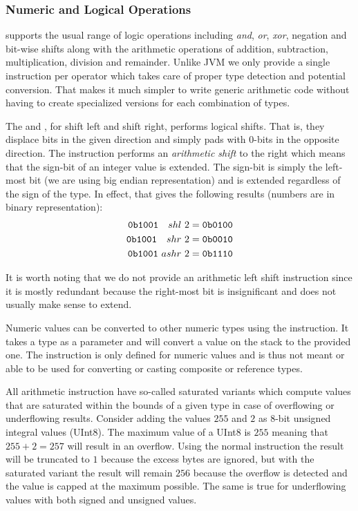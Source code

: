 \subsubsection{Numeric and Logical Operations}
\label{sec:design:stack:logic}

\thename{} supports the usual range of logic operations including \emph{and},
\emph{or}, \emph{xor}, negation and bit-wise shifts along with the arithmetic
operations of addition, subtraction, multiplication, division and
remainder. Unlike JVM we only provide a single instruction per operator which
takes care of proper type detection and potential conversion. That makes it much
simpler to write generic arithmetic code without having to create specialized
versions for each combination of types.

The  and , for shift left and shift right,
performs logical shifts. That is, they displace bits in the given direction and
simply pads with 0-bits in the opposite direction. The 
instruction performs an \textit{arithmetic shift} to the right which means that
the sign-bit of an integer value is extended. The sign-bit is simply the
left-most bit (we are using big endian representation) and is extended
regardless of the sign of the type. In effect, that gives the following results
(numbers are in binary representation): %
\begin{align*}
  {\tt 0b1001}\ \ \ shl\  2 &= {\tt 0b0100} \\
  {\tt 0b1001}\ \ \ shr\  2 &= {\tt 0b0010} \\
  {\tt 0b1001}\     ashr\ 2 &= {\tt 0b1110}
\end{align*}

It is worth noting that we do not provide an arithmetic left shift instruction
since it is mostly redundant because the right-most bit is insignificant and
does not usually make sense to extend.

Numeric values can be converted to other numeric types using the 
instruction. It takes a type as a parameter and will convert a value on the
stack to the provided one. The  instruction is only defined for
numeric values and is thus not meant or able to be used for converting or
casting composite or reference types.

All arithmetic instruction have so-called saturated variants which compute
values that are saturated within the bounds of a given type in case of
overflowing or underflowing results. Consider adding the values $255$ and $2$ as
8-bit unsigned integral values (UInt8). The maximum value of a UInt8 is $255$
meaning that $255+2=257$ will result in an overflow. Using the normal
 instruction the result will be truncated to $1$ because the excess
bytes are ignored, but with the saturated variant the result will remain $256$
because the overflow is detected and the value is capped at the maximum
possible. The same is true for underflowing values with both signed and unsigned
values.

